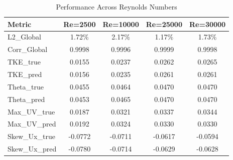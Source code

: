 \begin{table}[htbp]
\centering
\caption{Performance Across Reynolds Numbers}
\label{tab:results_summary}
\begin{tabular}{lcccc}
\hline
Metric & Re=2500 & Re=10000 & Re=25000 & Re=30000 \\
\hline
L2_Global & 1.72\% & 2.17\% & 1.17\% & 1.73\% \\
Corr_Global & 0.9998 & 0.9996 & 0.9999 & 0.9998 \\
TKE_true & 0.0155 & 0.0237 & 0.0262 & 0.0265 \\
TKE_pred & 0.0156 & 0.0235 & 0.0261 & 0.0261 \\
Theta_true & 0.0455 & 0.0464 & 0.0470 & 0.0470 \\
Theta_pred & 0.0453 & 0.0465 & 0.0470 & 0.0470 \\
Max_UV_true & 0.0187 & 0.0321 & 0.0337 & 0.0344 \\
Max_UV_pred & 0.0192 & 0.0324 & 0.0330 & 0.0330 \\
Skew_Ux_true & -0.0772 & -0.0711 & -0.0617 & -0.0594 \\
Skew_Ux_pred & -0.0780 & -0.0714 & -0.0629 & -0.0628 \\
\hline
\end{tabular}
\end{table}